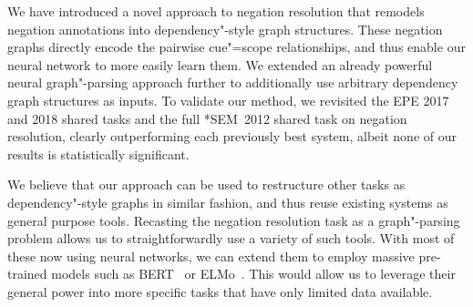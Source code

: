 \documentclass[11pt,a4paper]{article}
\theoremstyle{plain}
\begin{document}
We have introduced a novel approach to negation resolution that remodels 
negation annotations into dependency"-style graph structures.
These negation graphs directly encode the pairwise cue"=scope
relationships, and thus enable our neural network to more easily learn them.
We extended an already powerful neural graph"-parsing approach further to 
additionally use arbitrary dependency graph structures as inputs.
To validate our method, we revisited the EPE 2017 and 2018 shared
tasks and the full *SEM~2012 shared task on negation resolution, clearly 
outperforming each previously best system, albeit none of our results is
statistically significant.

We believe that our approach can be used to restructure other tasks as
dependency"-style graphs in similar fashion, and thus reuse existing systems as
general purpose tools.
Recasting the negation resolution task as a graph"-parsing problem allows us
to straightforwardly use a variety of such tools.
With most of these now using neural networks, we can extend them to employ
massive pre-trained models such as BERT~\citep{devlin2019bert} or
ELMo~\citep{peters2018deep}.
This would allow us to leverage their general power into more specific tasks
that have only limited data available.

%



\end{document}
